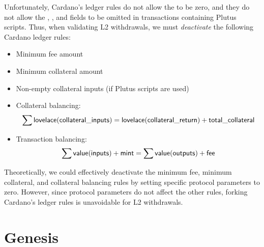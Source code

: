 \documentclass[../hydrozoa.tex]{subfiles}
\begin{document}
Unfortunately, Cardano's ledger rules do not allow the  to be zero, and they do not allow the , , and  fields to be omitted in transactions containing Plutus scripts.
Thus, when validating L2 withdrawals, we must \emph{deactivate} the following Cardano ledger rules:
\begin{itemize}
  \item Minimum fee amount
  \item Minimum collateral amount
  \item Non-empty collateral inputs (if Plutus scripts are used)
  \item Collateral balancing:
    \begin{equation*}
      \sum \mathsf{lovelace} (\mathsf{collateral\_inputs}) =
      \mathsf{lovelace} (\mathsf{collateral\_return}) + \mathsf{total\_collateral}
    \end{equation*}
  \item Transaction balancing:
    \begin{equation*}
      \sum \mathsf{value} (\mathsf{inputs}) + \mathsf{mint} =
      \sum \mathsf{value} (\mathsf{outputs}) + \mathsf{fee}
    \end{equation*}
\end{itemize}

Theoretically, we could effectively deactivate the minimum fee, minimum collateral, and collateral balancing rules by setting specific protocol parameters to zero.
However, since protocol parameters do not affect the other rules, forking Cardano's ledger rules is unavoidable for L2 withdrawals.

\section{Genesis}%
\label{h:ledger-genesis}%
\end{document}
